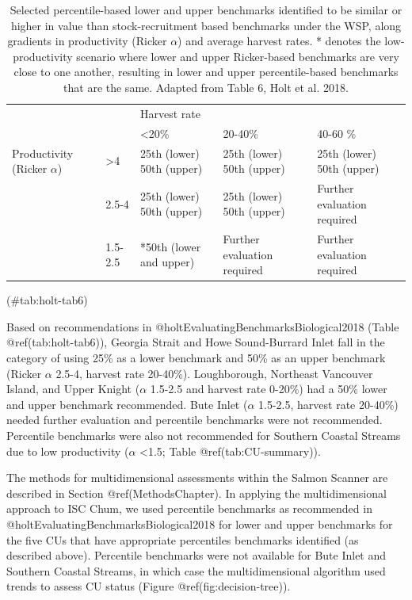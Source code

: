 \documentclass[
]{article}
\begin{document}
\needspace{0.35\textheight}

\renewcommand*{\arraystretch}{1.5}
\begin{table}[ht]
\centering
\caption{Selected percentile-based lower and upper benchmarks identified to be similar or higher in value than stock-recruitment based benchmarks under the WSP, along gradients in productivity (Ricker $\alpha$) and average harvest rates. * denotes the low-productivity scenario where lower and upper Ricker-based benchmarks are very close to one another, resulting in lower and upper percentile-based benchmarks that are the same. Adapted from Table 6, Holt et al. 2018.}
\begin{tabular}{l l p{2.5cm} p{2.5cm} p{2.5cm}}
\hline       &     & \multicolumn{3}{l}{Harvest rate}\\ 
& & <20\% & 20-40\% & 40-60 \% \\
\hline
Productivity (Ricker $\alpha$) & >4 & 25th (lower)  50th (upper) & 25th (lower) 50th (upper) & 25th (lower) 50th (upper) \\
& 2.5-4 & 25th (lower) 50th (upper) & 25th (lower) 50th (upper) & Further evaluation required \\
& 1.5-2.5 & *50th (lower and upper) & Further evaluation required & Further evaluation required \\               
\hline
\end{tabular}
(\#tab:holt-tab6)
\end{table}

\afterpage{\clearpage}

Based on recommendations in @holtEvaluatingBenchmarksBiological2018
(Table @ref(tab:holt-tab6)), Georgia Strait and Howe Sound-Burrard Inlet
fall in the category of using 25\% as a lower benchmark and 50\% as an
upper benchmark (Ricker \(\alpha\) 2.5-4, harvest rate 20-40\%).
Loughborough, Northeast Vancouver Island, and Upper Knight (\(\alpha\)
1.5-2.5 and harvest rate 0-20\%) had a 50\% lower and upper benchmark
recommended. Bute Inlet (\(\alpha\) 1.5-2.5, harvest rate 20-40\%)
needed further evaluation and percentile benchmarks were not
recommended. Percentile benchmarks were also not recommended for
Southern Coastal Streams due to low productivity (\(\alpha\)
\textless1.5; Table @ref(tab:CU-summary)).

The methods for multidimensional assessments within the Salmon Scanner
are described in Section @ref(MethodsChapter). In applying the
multidimensional approach to ISC Chum, we used percentile benchmarks as
recommended in @holtEvaluatingBenchmarksBiological2018 for lower and
upper benchmarks for the five CUs that have appropriate percentiles
benchmarks identified (as described above). Percentile benchmarks were
not available for Bute Inlet and Southern Coastal Streams, in which case
the multidimensional algorithm used trends to assess CU status (Figure
@ref(fig:decision-tree)).
\end{document}
